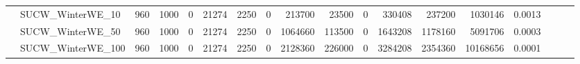 \begin{table}[h]
{\begin{tabular}{llrrrrrrrrrrrrrlll}
			& SUCW\_WinterWE\_10           & 960          & 1000        & 0          & 21274        & 2250        & 0          & 213700  & 23500    & 0      & 330408  & 237200   & 1030146    & 0.0013    &                          &                          &                          \\
			& SUCW\_WinterWE\_50           & 960          & 1000        & 0          & 21274        & 2250        & 0          & 1064660 & 113500   & 0      & 1643208 & 1178160  & 5091706    & 0.0003    &                          &                          &                          \\
			& SUCW\_WinterWE\_100          & 960          & 1000        & 0          & 21274        & 2250        & 0          & 2128360 & 226000   & 0      & 3284208 & 2354360  & 10168656   & 0.0001    &                          &                          &                          \\ \hline
		\end{tabular}%
	}
\end{table}

